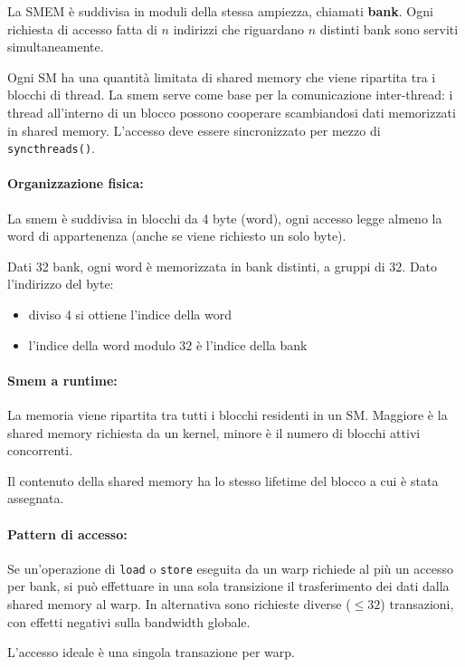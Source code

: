 La SMEM è suddivisa in moduli della stessa ampiezza, chiamati \textbf{bank}. Ogni richiesta di accesso fatta di $n$ indirizzi che riguardano $n$ distinti bank sono serviti simultaneamente.

Ogni SM ha una quantità limitata di shared memory che viene ripartita tra i blocchi di thread. La smem serve come base per la comunicazione inter-thread: i thread all'interno di un blocco possono cooperare scambiandosi dati memorizzati in shared memory. L'accesso deve essere sincronizzato per mezzo di \texttt{syncthreads()}.

\paragraph{Organizzazione fisica:} La smem è suddivisa in blocchi da 4 byte (word), ogni accesso legge almeno la word di appartenenza (anche se viene richiesto un solo byte).

Dati 32 bank, ogni word è memorizzata in bank distinti, a gruppi di 32. Dato l'indirizzo del byte: 
\begin{itemize}
	\item diviso 4 si ottiene l'indice della word

	\item l'indice della word modulo $32$ è l'indice della bank
\end{itemize}

\paragraph{Smem a runtime:} La memoria viene ripartita tra tutti i blocchi residenti in un SM. Maggiore è la shared memory richiesta da un kernel, minore è il numero di blocchi attivi concorrenti. 

Il contenuto della shared memory ha lo stesso lifetime del blocco a cui è stata assegnata.

\paragraph{Pattern di accesso:} Se un'operazione di \texttt{load} o \texttt{store} eseguita da un warp richiede al più un accesso per bank, si può effettuare in una sola transizione il trasferimento dei dati dalla shared memory al warp. In alternativa sono richieste diverse ($\leq 32$) transazioni, con effetti negativi sulla bandwidth globale.

L'accesso ideale è una singola transazione per warp.

